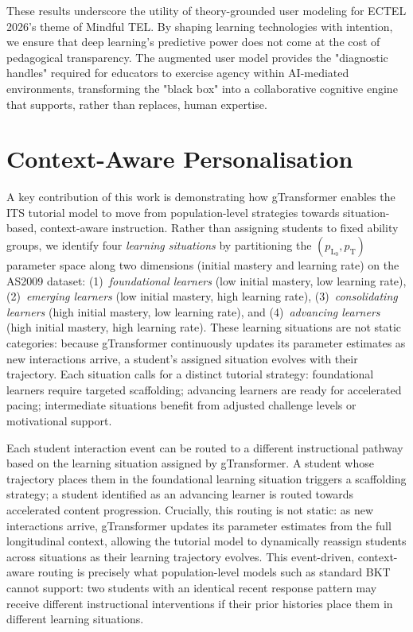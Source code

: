 \documentclass[runningheads]{llncs}
\begin{document}
These results underscore the utility of theory-grounded user modeling for ECTEL 2026's theme of Mindful TEL. By shaping learning technologies with intention, we ensure that deep learning's predictive power does not come at the cost of pedagogical transparency. The augmented user model provides the "diagnostic handles" required for educators to exercise agency within AI-mediated environments, transforming the "black box" into a collaborative cognitive engine that supports, rather than replaces, human expertise.

%
\section{Context-Aware Personalisation}
\label{sec_personalisation}


A key contribution of this work is demonstrating how gTransformer enables the ITS tutorial model to move from population-level strategies towards situation-based, context-aware instruction. Rather than assigning students to fixed ability groups, we identify four \textit{learning situations} by partitioning the $(p_{\text{L}_0}, p_{\text{T}})$ parameter space along two dimensions (initial mastery and learning rate) on the AS2009 dataset: (1)~\textit{foundational learners} (low initial mastery, low learning rate), (2)~\textit{emerging learners} (low initial mastery, high learning rate), (3)~\textit{consolidating learners} (high initial mastery, low learning rate), and (4)~\textit{advancing learners} (high initial mastery, high learning rate). These learning situations are not static categories: because gTransformer continuously updates its parameter estimates as new interactions arrive, a student's assigned situation evolves with their trajectory. Each situation calls for a distinct tutorial strategy: foundational learners require targeted scaffolding; advancing learners are ready for accelerated pacing; intermediate situations benefit from adjusted challenge levels or motivational support.

Each student interaction event can be routed to a different instructional pathway based on the learning situation assigned by gTransformer. A student whose trajectory places them in the foundational learning situation triggers a scaffolding strategy; a student identified as an advancing learner is routed towards accelerated content progression. Crucially, this routing is not static: as new interactions arrive, gTransformer updates its parameter estimates from the full longitudinal context, allowing the tutorial model to dynamically reassign students across situations as their learning trajectory evolves. This event-driven, context-aware routing is precisely what population-level models such as standard BKT cannot support: two students with an identical recent response pattern may receive different instructional interventions if their prior histories place them in different learning situations.
\end{document}
